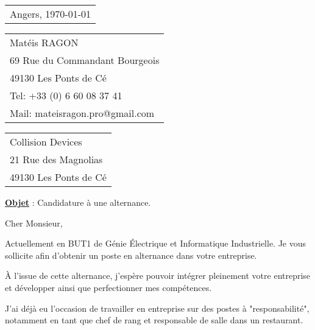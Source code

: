 \documentclass[french]{article}
\begin{document}

\hfill
\begin{tabular}{@{} l}
	\bigskip Angers, \today \\ %
\end{tabular}


\begin{tabular}{l @{}}
	Matéis RAGON \\
	69 Rue du Commandant Bourgeois \\ %
	49130 Les Ponts de Cé \\
	Tel: +33 (0) 6 60 08 37 41 \\
	Mail: mateisragon.pro@gmail.com
\end{tabular}

\hfill
\begin{tabular}{@{} l}
	Collision Devices \\
	21 Rue des Magnolias \\
	49130 Les Ponts de Cé
\end{tabular}

\bigskip %

\textbf{\underline{Objet}} :  Candidature à une alternance.


\bigskip %

Cher Monsieur,


Actuellement en BUT1 de Génie Électrique et Informatique Industrielle. Je vous sollicite afin d'obtenir un poste en alternance dans votre entreprise.

À l'issue de cette alternance, j'espère pouvoir intégrer pleinement votre entreprise et développer ainsi que perfectionner mes compétences.

J'ai déjà eu l'occasion de travailler en entreprise sur des postes à "responsabilité", notamment en tant que chef de rang et responsable de salle dans un restaurant.
\end{document}
